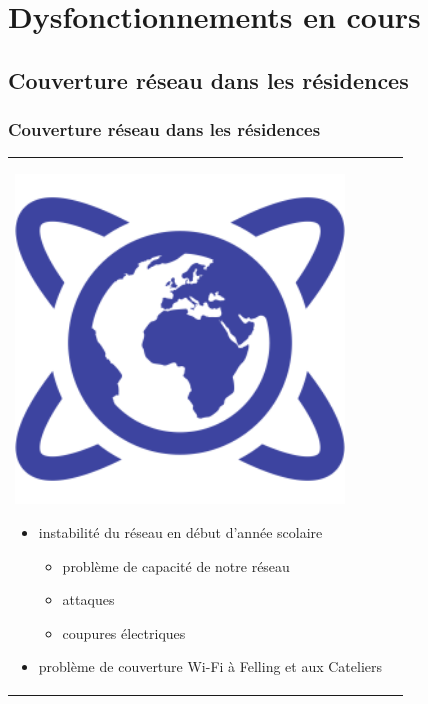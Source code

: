\documentclass[handout]{beamer}
\begin{document}
	\section{Dysfonctionnements en cours}

	\subsection{Couverture réseau dans les résidences}
		\begin{frame}
		\frametitle{Couverture réseau dans les résidences}

		\begin{tabular}{l l}
			\begin{minipage}{0.2\textwidth}
				\begin{center}
					\includegraphics[width=0.9\textwidth]{images/internet.png}
				\end{center}
			\end{minipage}

			\begin{minipage}{0.8\textwidth}
				\begin{itemize}
					\item instabilité du réseau en début d'année scolaire
					\begin{itemize}
						\item problème de capacité de notre réseau
						\item attaques
						\item coupures électriques
					\end{itemize}
					\item problème de couverture Wi-Fi à Felling et aux Cateliers
				\end{itemize}
			\end{minipage}
			
		\end{tabular}
		\end{frame}
\end{document}
